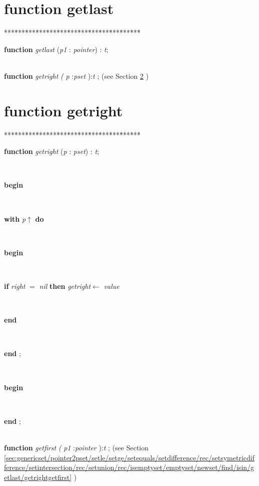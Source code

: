 \documentclass[10pt, a4paper]{article}
\begin{document}
\section{function getlast}\label{sec:genericset/pointer2pset/setle/setge/setequals/setdifference/rec/setsymetricdifference/setintersection/rec/setunion/rec/isemptyset/emptyset/newset/find/isingetlast}

\begin{tabbing}
***\=***\=***\=***\=***\=***\=***\=***\=***\=***\=***\=***\=***\=\kill
\parbox{14cm}{\textsf {\textbf {function } \textsf{\textit{getlast} (\textit{p1} : \textit{pointer}) : \textit{t}}; }}\\
\+\textsf{\textbf{function}  \textit{getright} \textit{(} \textit{p} :\textit{pset} ):\textit{t} ;} (see Section \ref{sec:genericset/pointer2pset/setle/setge/setequals/setdifference/rec/setsymetricdifference/setintersection/rec/setunion/rec/isemptyset/emptyset/newset/find/isin/getlastgetright} )\\
\end{tabbing}
\section{function getright}\label{sec:genericset/pointer2pset/setle/setge/setequals/setdifference/rec/setsymetricdifference/setintersection/rec/setunion/rec/isemptyset/emptyset/newset/find/isin/getlastgetright}

\begin{tabbing}
***\=***\=***\=***\=***\=***\=***\=***\=***\=***\=***\=***\=***\=\kill
\parbox{14cm}{\textsf {\textbf {function } \textsf{\textit{getright} (\textit{p} : \textit{pset}) : \textit{t}}; }}\\
\+\parbox{14cm}{\textsf{\textbf{begin} }}\\
\+\parbox{14cm}{\textsf {\textbf {with } \textsf{\textit{p}$\uparrow$\textit{}} \textbf{ do } }}\\
\<\parbox{14cm}{\textsf{\textbf{begin} }}\\
\+\parbox{14cm}{\textsf {\textbf {if } \textsf{\textit{right} $=$ \textit{nil}} \textbf{ then } \textsf{\textit{getright}$\leftarrow$ \textit{value}}}}\\
\<\-\<\-\parbox{14cm}{\textsf{\textbf{end} }}\\
\<\-\parbox{14cm}{\textsf{\textbf{end} ;}}\\
\+\parbox{14cm}{\textsf{\textbf{begin} }}\\
\<\-\parbox{14cm}{\textsf{\textbf{end} ;}}\\
\+\textsf{\textbf{function}  \textit{getfirst} \textit{(} \textit{p1} :\textit{pointer} ):\textit{t} ;} (see Section \ref{sec:genericset/pointer2pset/setle/setge/setequals/setdifference/rec/setsymetricdifference/setintersection/rec/setunion/rec/isemptyset/emptyset/newset/find/isin/getlast/getrightgetfirst} )\\
\end{tabbing}
\end{document}
